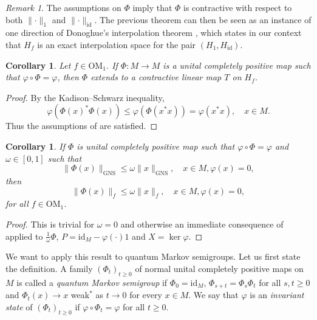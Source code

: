 \documentclass[a4paper,12pt]{amsart}
\newcommand{\norm}[1]{\lVert#1\rVert}
\newcommand{\id}{\mathrm{id}}
\newcommand{\OM}{\mathrm{OM}}
\renewcommand{\phi}{\varphi}
\theoremstyle{plain}
\newtheorem{corollary}[proposition]{Corollary}
\theoremstyle{remark}
\newtheorem{remark}[proposition]{Remark}
\theoremstyle{definition}
\begin{document}
\begin{remark}
    The assumptions on $\Phi$ imply that $\Phi$ is contractive with respect to both $\norm\cdot_1$ and $\norm\cdot_\id$. The previous theorem can then be seen as an instance of one direction of Donoghue's interpolation theorem \cite[Theorem 1]{Don67}, which states in our context that $H_f$ is an exact interpolation space for the pair $(H_1,H_\id)$.
\end{remark}

\begin{corollary}\label{lem:contractive_ext}
    Let $f\in \OM_1$. If $\Phi\colon M\to M$ is a unital completely positive map such that $\phi\circ\Phi=\phi$, then $\Phi$ extends to a contractive linear map $T$ on $H_f$.
\end{corollary}
\begin{proof}
    By the Kadison--Schwarz inequality,
        \begin{equation*}
            \phi(\Phi(x)^\ast\Phi(x))\leq \phi(\Phi(x^\ast x))=\phi(x^\ast x),\quad x\in M.
        \end{equation*}
    Thus the assumptions of  are satisfied.
\end{proof}

\begin{corollary}\label{cor:interpolation}
    If $\Phi$ is unital completely positive map such that $\phi\circ \Phi=\phi$ and $\omega\in [0,1]$ such that
    \begin{equation*}
        \norm{\Phi(x)}_{\mathrm{GNS}}\leq \omega\norm{x}_{\mathrm{GNS}},\quad x\in M,\phi(x)=0,
    \end{equation*}
    then
    \begin{equation*}
        \norm{\Phi(x)}_{f}\leq \omega\norm{x}_{f},\quad x\in M,\phi(x)=0,
    \end{equation*}
    for all $f\in\OM_1$.
\end{corollary}
\begin{proof}
    This is trivial for $\omega=0$ and otherwise an immediate consequence of  applied to $\frac 1\omega \Phi$, $P=\id_M-\phi(\cdot)1$ and $X=\ker \phi.$
\end{proof}

We want to apply this result to quantum Markov semigroups. Let us first state the definition. A family $(\Phi_t)_{t\geq 0}$ of normal unital completely positive maps on $M$ is called a \emph{quantum Markov semigroup} if $\Phi_0=\id_M$, $\Phi_{s+t}=\Phi_s\Phi_t$ for all $s,t\geq 0$ and $\Phi_t(x)\to x$ weak$^\ast$ as $t\to 0$ for every $x\in M$. We say that $\phi$ is an \emph{invariant state} of $(\Phi_t)_{t\geq 0}$ if $\phi\circ\Phi_t=\phi$ for all $t\geq 0$.
\end{document}
